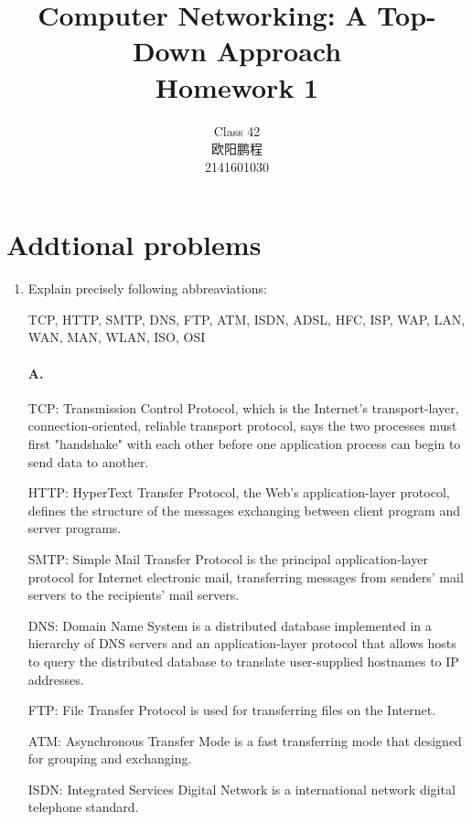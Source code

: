 \documentclass[]{article}
\title{Computer Networking: A Top-Down Approach \\ Homework 1}
\author{Class 42 \\ 欧阳鹏程 \\ 2141601030}
\begin{document}
\maketitle


\section{Addtional problems}

\begin{enumerate}
	\item 
	Explain precisely following abbreaviations:
	\begin{itemize}
		\subitem
		TCP,
		HTTP,
		SMTP,
		DNS,
		FTP,
		ATM,
		ISDN,
		ADSL,
		HFC,
		ISP,
		WAP,
		LAN,
		WAN,
		MAN,
		WLAN,
		ISO,
		OSI
	\end{itemize}

	\paragraph{A.}
	TCP: Transmission Control Protocol, which is the Internet's transport-layer, connection-oriented, reliable transport protocol, says the two processes must first "handshake" with each other before one application process can begin to send data to another.
	
	\begin{adjustwidth}{0.05cm}{0cm}
		\qquad HTTP: HyperText Transfer Protocol, the Web's application-layer protocol, defines the structure of the messages exchanging between client program and server programs.
		
		\qquad SMTP: Simple Mail Transfer Protocol is the principal application-layer protocol for Internet electronic mail, transferring messages from senders' mail servers to the recipients' mail servers.
		
		\qquad DNS: Domain Name System is a distributed database implemented in a hierarchy of DNS servers and an application-layer protocol that allows hosts to query the distributed database to translate user-supplied hostnames to IP addresses.
		
		\qquad FTP: File Transfer Protocol is used for transferring files on the Internet.
		
		\qquad ATM: Asynchronous Transfer Mode is a fast transferring mode that designed for grouping and exchanging.
		
		\qquad ISDN: Integrated Services Digital Network is a international network digital telephone standard.
		

\end{adjustwidth}
\end{enumerate}
\end{document}
